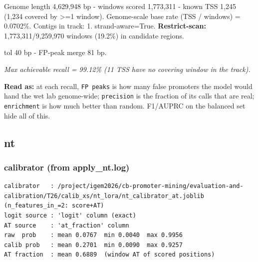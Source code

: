 \documentclass[10pt]{article}
\begin{document}
Genome length 4,629,948 bp - windows scored 1,773,311 - known TSS 1,245 (1,234 covered by >=1 window). Genome-scale base rate (TSS / windows) = 0.0702\%. Contigs in track: 1. strand-aware=True. \textbf{Restrict-scan:} 1,773,311/9,259,970 windows (19.2\%) in candidate regions.

tol 40 bp - FP-peak merge 81 bp.

\begin{center}
\end{center}

{\itshape Max achievable recall = 99.12\% (11 TSS have no covering window in the track).}

\textbf{Read as:} at each recall, \texttt{FP peaks} is how many false promoters the model would hand the wet lab genome-wide; \texttt{precision} is the fraction of its calls that are real; \texttt{enrichment} is how much better than random. F1/AUPRC on the balanced set hide all of this.

\subsection*{nt}

\subsubsection*{calibrator (from apply\_nt.log)}
\begin{verbatim}
calibrator   : /project/igem2026/cb-promoter-mining/evaluation-and-calibration/T26/calib_xs/nt_lora/nt_calibrator_at.joblib  (n_features_in_=2: score+AT)
logit source : 'logit' column (exact)
AT source    : 'at_fraction' column
raw  prob    : mean 0.0767  min 0.0040  max 0.9956
calib prob   : mean 0.2701  min 0.0090  max 0.9257
AT fraction  : mean 0.6889  (window AT of scored positions)
\end{verbatim}
\end{document}
